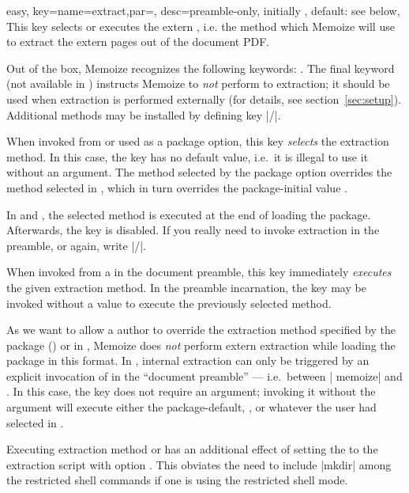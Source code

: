 \documentclass[a4paper,11pt]{article}
\begin{document}
\begin{doc}{easy,
    key={name=extract,par=,
      desc={preamble-only, initially , default: see below}},
  }
  This key selects or executes the extern , i.e. the
  method which Memoize will use to extract the extern pages out of the document
  PDF.

  Out of the box, Memoize recognizes the following 
  keywords: .  The final
  keyword (not available in ) instructs Memoize to \emph{not}
  perform to extraction; it should be used when extraction is performed
  externally (for details, see section~\ref{sec:setup}).  Additional methods
  may be installed by defining key |/|.
  
  When invoked from  or used as a package option, this key
  \emph{selects} the extraction method.  In this case, the key has no default
  value, i.e.\ it is illegal to use it without an argument.  The method
  selected by the package option overrides the method selected in
  , which in turn overrides the package-initial value
  .

  In  and , the selected method is executed at
  the end of loading the package.  Afterwards, the key is disabled.  If you
  really need to invoke extraction in the preamble, or again, write
  |/|.

  When invoked from a  in the document preamble, this key
  immediately \emph{executes} the given extraction method.  In the preamble
  incarnation, the key may be invoked without a value to execute the previously
  selected method.

  As we want to allow a  author to override the extraction
  method specified by the package () or in
  , Memoize does \emph{not} perform extern extraction
  while loading the package in this format.  In , internal
  extraction can only be triggered by an explicit invocation of
   in the ``document preamble'' --- i.e.\ between |
  memoize| and .  In this case,
  the key does not require an argument; invoking it without the argument will
  execute either the package-default, , or whatever the
  user had selected in .

  Executing extraction method  or 
  has an additional effect of setting the  to the
  extraction script with option .  This
  obviates the need to include |mkdir| among the restricted shell commands if
  one is using the restricted shell mode.
\end{doc}
\end{document}

